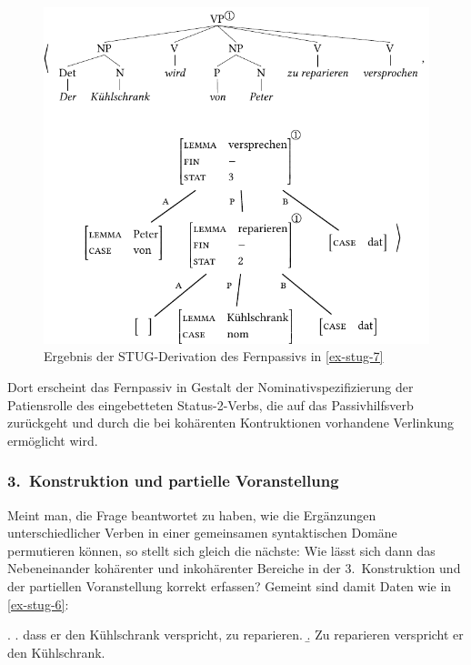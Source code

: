 \begin{figure}[t]
\centering
\includegraphics{graphics/abb910.pdf}
\caption{\label{fig-stug-12} Ergebnis der STUG-Derivation des Fernpassivs in \ref{ex-stug-7}}
\end{figure}
Dort erscheint das Fernpassiv in Gestalt der Nominativspezifizierung der Patiensrolle des eingebetteten Status-2-Verbs, die auf das Passivhilfsverb zurückgeht und durch die bei kohärenten Kontruktionen vorhandene Verlinkung ermöglicht wird.

\subsubsection*{3.~Konstruktion und partielle Voranstellung}

Meint man, die Frage beantwortet zu haben, wie die Ergänzungen unterschiedlicher Verben in einer gemeinsamen syntaktischen Domäne permutieren können, so stellt sich gleich die nächste: Wie lässt sich dann das Nebeneinander kohärenter und inkohärenter Bereiche in der 3.~Konstruktion und der partiellen Voranstellung korrekt erfassen? Gemeint sind damit Daten wie in \ref{ex-stug-6}:

\ex. \label{ex-stug-6}
\a. \label{ex-stug-6-a} dass er den Kühlschrank verspricht, zu reparieren.
\b. \label{ex-stug-6-b} Zu reparieren verspricht er den Kühlschrank.

